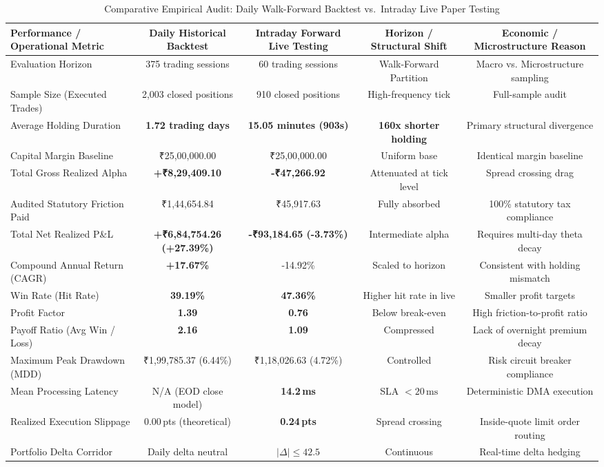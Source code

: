 \documentclass[journal]{IEEEtran}
\begin{document}
\begin{table}[!t]
\renewcommand{\arraystretch}{1.2}
\caption{Comparative Empirical Audit: Daily Walk-Forward Backtest vs.\ Intraday Live Paper Testing}
\label{tab:comparative_audit}
\centering
\small
\begin{tabular}{lcccc}
\toprule
\textbf{Performance / Operational Metric} & \textbf{Daily Historical Backtest} & \textbf{Intraday Forward Live Testing} & \textbf{Horizon / Structural Shift} & \textbf{Economic / Microstructure Reason} \\
\midrule
Evaluation Horizon              & 375 trading sessions & 60 trading sessions & Walk-Forward Partition & Macro vs. Microstructure sampling \\
Sample Size (Executed Trades)   & 2{,}003 closed positions & 910 closed positions & High-frequency tick & Full-sample audit \\
Average Holding Duration        & \textbf{1.72 trading days} & \textbf{15.05 minutes (903s)} & \textbf{160x shorter holding} & Primary structural divergence \\
Capital Margin Baseline         & ₹25,00,000.00 & ₹25,00,000.00 & Uniform base & Identical margin baseline \\
Total Gross Realized Alpha      & \textbf{+₹8,29,409.10} & \textbf{-₹47,266.92} & Attenuated at tick level & Spread crossing drag \\
Audited Statutory Friction Paid & ₹1,44,654.84 & ₹45,917.63 & Fully absorbed & 100\% statutory tax compliance \\
Total Net Realized P\&L         & \textbf{+₹6,84,754.26 (+27.39\%)} & \textbf{-₹93,184.65 (-3.73\%)} & Intermediate alpha & Requires multi-day theta decay \\
Compound Annual Return (CAGR)   & \textbf{+17.67\%} & -14.92\% & Scaled to horizon & Consistent with holding mismatch \\
Win Rate (Hit Rate)             & \textbf{39.19\%} & \textbf{47.36\%} & Higher hit rate in live & Smaller profit targets \\
Profit Factor                   & \textbf{1.39} & \textbf{0.76} & Below break-even & High friction-to-profit ratio \\
Payoff Ratio (Avg Win / Loss)   & \textbf{2.16} & \textbf{1.09} & Compressed & Lack of overnight premium decay \\
Maximum Peak Drawdown (MDD)     & ₹1,99,785.37 (6.44\%) & ₹1,18,026.63 (4.72\%) & Controlled & Risk circuit breaker compliance \\
Mean Processing Latency         & N/A (EOD close model) & \textbf{14.2\,ms} & SLA $<20\,\mathrm{ms}$ & Deterministic DMA execution \\
Realized Execution Slippage     & 0.00\,pts (theoretical) & \textbf{0.24\,pts} & Spread crossing & Inside-quote limit order routing \\
Portfolio Delta Corridor        & Daily delta neutral & $|\Delta| \le 42.5$ & Continuous & Real-time delta hedging \\
\bottomrule
\end{tabular}
\end{table}
\end{document}
